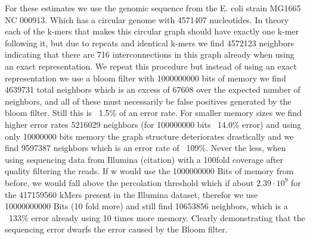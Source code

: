 \documentclass[12pt]{article} \usepackage{simplemargins}
\begin{document}
For these estimates we use the genomic sequence from the E. coli strain 
MG1665 NC 000913. Which has a circular genome with 4571407 nucleotides. 
In theory each of the k-mers that makes this
circular graph should have exactly one k-mer following it, but due to 
repeats and identical k-mers we find 4572123 neighbors indicating that 
there are 716 interconnections in this graph already when using an exact 
representation. We repeat this procedure but instead of using an exact representation
we use a bloom filter with 1000000000 bits of memory we find 
4639731 total neighbors which is an excess of 67608 over the expected number 
of neighbors, and all of these must necessarily be false positives generated 
by the bloom filter. Still this is ~1.5\% of an error rate. For smaller memory sizes we find higher
error rates 5216029 neighbors (for 100000000 bits ~14.0\% error) and using only 
10000000 bits memory the graph structure deteriorates drastically and we 
find 9597387 neighbors which is an error rate of ~109\%. Never the less, when using 
sequencing data from Illumina (citation) with a 100fold coverage after quality filtering
the reads. If w would use the 1000000000 Bits of memory from before, we would 
fall above the percolation threshold which if about $2.39 \cdot 10^9$ for the 417159560 
kMers present in the Illumina dataset, therefor we use 10000000000 Bits (10 fold more) 
and still find 10653856 neighbors, which is a ~133\% error already using 10 times 
more memory. Clearly demonstrating that
the sequencing error dwarfs the error caused by the Bloom filter.
\end{document}
